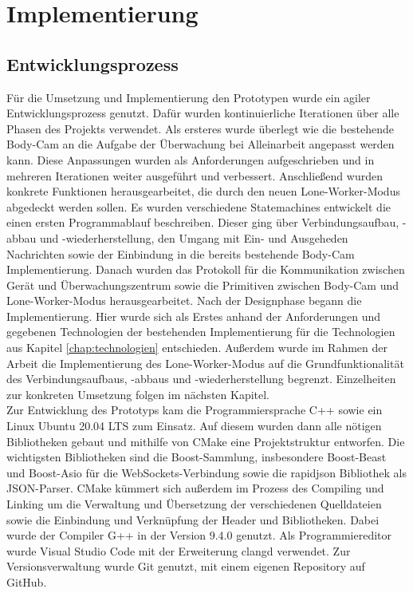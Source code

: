 \documentclass[thesis.tex]{subfiles}
\begin{document}
\section{Implementierung}
\subsection{Entwicklungsprozess}

Für die Umsetzung und Implementierung den Prototypen wurde ein agiler Entwicklungsprozess genutzt.
Dafür wurden kontinuierliche Iterationen über alle Phasen des Projekts verwendet.
Als ersteres wurde überlegt wie die bestehende Body-Cam an die Aufgabe der Überwachung bei Alleinarbeit angepasst werden kann.
Diese Anpassungen wurden als Anforderungen aufgeschrieben und in mehreren Iterationen weiter ausgeführt und verbessert.
Anschließend wurden konkrete Funktionen herausgearbeitet, die durch den neuen Lone-Worker-Modus abgedeckt werden sollen.
Es wurden verschiedene Statemachines entwickelt die einen ersten Programmablauf beschreiben.
Dieser ging über Verbindungsaufbau, -abbau und -wiederherstellung, den Umgang mit Ein- und Ausgeheden Nachrichten sowie der Einbindung in die bereits bestehende Body-Cam Implementierung.
Danach wurden das Protokoll für die Kommunikation zwischen Gerät und Überwachungszentrum sowie die Primitiven zwischen Body-Cam und Lone-Worker-Modus herausgearbeitet.
Nach der Designphase begann die Implementierung.
Hier wurde sich als Erstes anhand der Anforderungen und gegebenen Technologien der bestehenden Implementierung für die Technologien aus Kapitel \autoref{chap:technologien} entschieden.
Außerdem wurde im Rahmen der Arbeit die Implementierung des Lone-Worker-Modus auf die Grundfunktionalität des Verbindungsaufbaus, -abbaus und -wiederherstellung begrenzt.
Einzelheiten zur konkreten Umsetzung folgen im nächsten Kapitel.
\\

Zur Entwicklung des Prototyps kam die Programmiersprache C++ sowie ein Linux Ubuntu 20.04 LTS zum Einsatz.
Auf diesem wurden dann alle nötigen Bibliotheken gebaut und mithilfe von CMake eine Projektstruktur entworfen.
Die wichtigsten Bibliotheken sind die Boost-Sammlung, insbesondere Boost-Beast und Boost-Asio für die WebSockets-Verbindung sowie die rapidjson Bibliothek als JSON-Parser.
CMake kümmert sich außerdem im Prozess des Compiling und Linking um die Verwaltung und Übersetzung der verschiedenen Quelldateien
sowie die Einbindung und Verknüpfung der Header und Bibliotheken.
Dabei wurde der Compiler G++ in der Version 9.4.0 genutzt.
Als Programmiereditor wurde Visual Studio Code mit der Erweiterung \glqq clangd\grqq{} verwendet.
Zur Versionsverwaltung wurde Git genutzt, mit einem eigenen Repository auf GitHub.
\\
\end{document}
